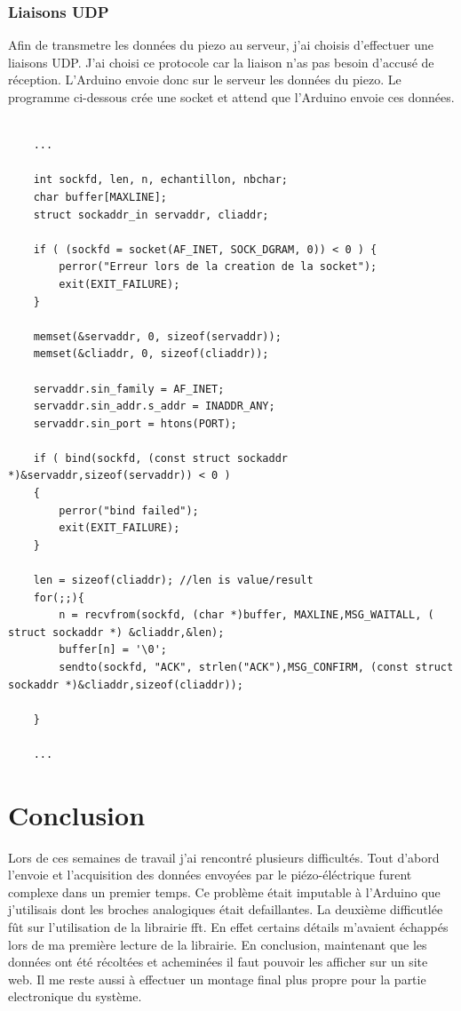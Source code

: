 \documentclass[11pt,french,a4paper]{article}
\begin{document}
\subsubsection{Liaisons UDP}
Afin de transmetre les données du piezo au serveur, j'ai choisis d'effectuer une liaisons UDP. J'ai choisi ce protocole car la liaison n'as pas besoin d'accusé de réception. L'Arduino envoie donc sur le serveur les données du piezo. Le programme ci-dessous crée une socket et attend que l'Arduino envoie ces données. 
\begin{scriptsize}
\begin{lstlisting}

	...

	int sockfd, len, n, echantillon, nbchar;
	char buffer[MAXLINE];
	struct sockaddr_in servaddr, cliaddr;
	
	if ( (sockfd = socket(AF_INET, SOCK_DGRAM, 0)) < 0 ) {
		perror("Erreur lors de la creation de la socket");
		exit(EXIT_FAILURE);
	}

	memset(&servaddr, 0, sizeof(servaddr));
	memset(&cliaddr, 0, sizeof(cliaddr));

	servaddr.sin_family = AF_INET; 
	servaddr.sin_addr.s_addr = INADDR_ANY;
	servaddr.sin_port = htons(PORT);

	if ( bind(sockfd, (const struct sockaddr *)&servaddr,sizeof(servaddr)) < 0 )
	{
		perror("bind failed");
		exit(EXIT_FAILURE);
	}

	len = sizeof(cliaddr); //len is value/result
	for(;;){
		n = recvfrom(sockfd, (char *)buffer, MAXLINE,MSG_WAITALL, ( struct sockaddr *) &cliaddr,&len);
		buffer[n] = '\0';
		sendto(sockfd, "ACK", strlen("ACK"),MSG_CONFIRM, (const struct sockaddr *)&cliaddr,sizeof(cliaddr));
	
	}

	...
\end{lstlisting}
\end{scriptsize}
\section{Conclusion}
Lors de ces semaines de travail j'ai rencontré plusieurs difficultés. Tout d'abord l'envoie et l'acquisition des données envoyées par le piézo-éléctrique furent complexe dans un premier temps. Ce problème était imputable à l'Arduino que j'utilisais dont les broches analogiques était defaillantes. La deuxième difficutlée fût sur l'utilisation de la librairie fft. En effet certains détails m'avaient échappés lors de ma première lecture de la librairie.
En conclusion, maintenant que les données ont été récoltées et acheminées il faut pouvoir les afficher sur un site web. Il me reste aussi à effectuer un montage final plus propre pour la partie electronique du système. 
\newpage
\listoffigures
\end{document}
